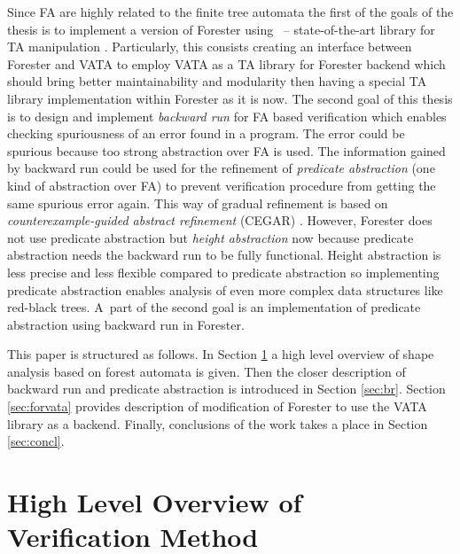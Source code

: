 \documentclass[fleqn,11pt]{ExcelAtFIT} %
\begin{document}
Since FA are highly related to the finite tree automata the first of the goals of the thesis is to implement
a version of Forester using \vata\ -- state-of-the-art library for TA manipulation \cite{libvata}.
Particularly, this consists creating an interface between Forester and VATA to employ VATA as a TA library for Forester backend
which should bring better maintainability and modularity then having a special TA library implementation within Forester as it is now.
The second goal of this thesis is to design and implement \emph{backward run} for FA based verification
which enables checking spuriousness of an error found in a program.
The error could be spurious because too strong abstraction over FA is used.
The information gained by backward run could be used for the refinement of \emph{predicate abstraction} (one kind of abstraction over FA)
to prevent verification procedure from getting the same spurious error again.
This way of gradual refinement is based on \emph{counterexample-guided abstract refinement} (CEGAR) \cite{cegar}.
However, Forester does not use predicate abstraction but \emph{height abstraction} now
because predicate abstraction needs the backward run to be fully functional.
Height abstraction is less precise and less flexible compared to predicate abstraction so implementing predicate abstraction
enables analysis of even more complex data structures like red-black trees.
A~part of the second goal is an implementation of predicate abstraction using backward run in Forester.

This paper is structured as follows.
In Section \ref{sec:overview} a high level overview of shape analysis based on forest automata
is given.
Then the closer description of backward run and predicate abstraction is introduced in Section \ref{sec:br}.
Section \ref{sec:forvata} provides description of modification of Forester to use the VATA library as a backend.
Finally, conclusions of the work takes a place in Section \ref{sec:concl}.

\section{High Level Overview of Verification Method}
\label{sec:overview}
\end{document}
